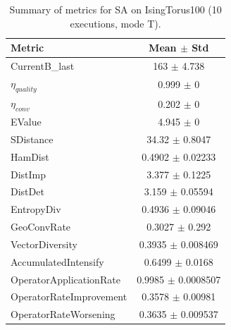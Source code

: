 \begin{table}[t]
\centering
\small
\begin{tabular}{lc}
\toprule
Metric & Mean $\pm$ Std \\
\midrule
CurrentB\_last & 163 $\pm$ 4.738 \\
$\eta_{quality}$ & 0.999 $\pm$ 0 \\
$\eta_{conv}$ & 0.202 $\pm$ 0 \\
EValue & 4.945 $\pm$ 0 \\
SDistance & 34.32 $\pm$ 0.8047 \\
HamDist & 0.4902 $\pm$ 0.02233 \\
DistImp & 3.377 $\pm$ 0.1225 \\
DistDet & 3.159 $\pm$ 0.05594 \\
EntropyDiv & 0.4936 $\pm$ 0.09046 \\
GeoConvRate & 0.3027 $\pm$ 0.292 \\
VectorDiversity & 0.3935 $\pm$ 0.008469 \\
AccumulatedIntensify & 0.6499 $\pm$ 0.0168 \\
OperatorApplicationRate & 0.9985 $\pm$ 0.0008507 \\
OperatorRateImprovement & 0.3578 $\pm$ 0.00981 \\
OperatorRateWorsening & 0.3635 $\pm$ 0.009537 \\
\bottomrule
\end{tabular}
\caption{Summary of metrics for SA on IsingTorus100 (10 executions, mode T).}
\label{tab:summary_SA_IsingTorus100}
\end{table}
